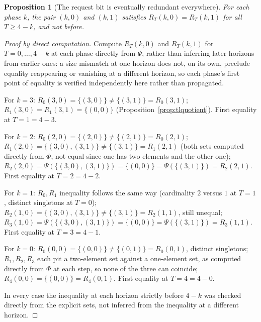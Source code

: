 \documentclass[11pt]{report}
\newtheorem{proposition}{Proposition}[chapter]
\begin{document}
\begin{proposition}[The request bit is eventually redundant everywhere]
\label{prop:eventual}
For each phase $k$, the pair $(k,0)$ and $(k,1)$ satisfies
$R_T(k,0) = R_T(k,1)$ for all $T \geq 4 - k$, and not before.
\end{proposition}
\begin{proof}[Proof by direct computation]
Compute $R_T(k,0)$ and $R_T(k,1)$ for $T = 0, \dots, 4-k$ at each
phase directly from $\Psi$, rather than inferring later horizons from
earlier ones: a size mismatch at one horizon does not, on its own,
preclude equality reappearing or vanishing at a different horizon, so
each phase's first point of equality is verified independently here
rather than propagated.

For $k=3$: $R_0(3,0) = \{(3,0)\} \neq \{(3,1)\} = R_0(3,1)$;
$R_1(3,0) = R_1(3,1) = \{(0,0)\}$ (Proposition~\ref{prop:tlquotient}).
First equality at $T=1=4-3$.

For $k=2$: $R_0(2,0) = \{(2,0)\} \neq \{(2,1)\} = R_0(2,1)$;
$R_1(2,0) = \{(3,0),(3,1)\} \neq \{(3,1)\} = R_1(2,1)$ (both sets
computed directly from $\Phi$, not equal since one has two elements
and the other one); $R_2(2,0) = \Psi(\{(3,0),(3,1)\}) = \{(0,0)\} =
\Psi(\{(3,1)\}) = R_2(2,1)$. First equality at $T=2=4-2$.

For $k=1$: $R_0, R_1$ inequality follows the same way (cardinality
$2$ versus $1$ at $T=1$, distinct singletons at $T=0$); $R_2(1,0) =
\{(3,0),(3,1)\} \neq \{(3,1)\} = R_2(1,1)$, still unequal;
$R_3(1,0) = \Psi(\{(3,0),(3,1)\}) = \{(0,0)\} = \Psi(\{(3,1)\}) =
R_3(1,1)$. First equality at $T=3=4-1$.

For $k=0$: $R_0(0,0) = \{(0,0)\} \neq \{(0,1)\} = R_0(0,1)$, distinct
singletons; $R_1, R_2, R_3$ each pit a two-element set against a
one-element set, as computed directly from $\Phi$ at each step, so
none of the three can coincide; $R_4(0,0) = \{(0,0)\} = R_4(0,1)$.
First equality at $T=4=4-0$.

In every case the inequality at each horizon strictly before $4-k$
was checked directly from the explicit sets, not inferred from the
inequality at a different horizon.
\end{proof}
\end{document}
